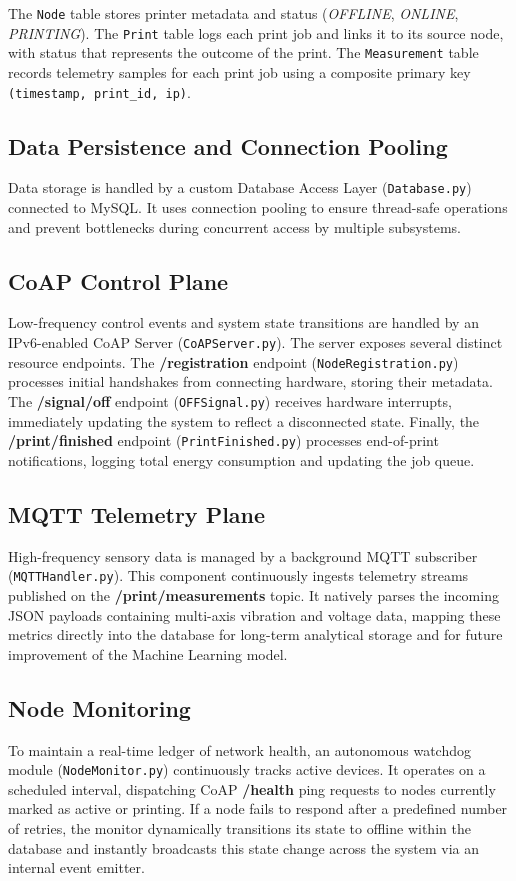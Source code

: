 \noindent

The \texttt{Node} table stores printer metadata and status (\textit{OFFLINE}, \textit{ONLINE}, \textit{PRINTING}). The \texttt{Print} table logs each print job and links it to its source node, with status that represents the outcome of the print. The \texttt{Measurement} table records telemetry samples for each print job using a composite primary key \texttt{(timestamp, print\_id, ip)}. 

\subsection{Data Persistence and Connection Pooling}
Data storage is handled by a custom Database Access Layer (\texttt{Database.py}) connected to MySQL. It uses connection pooling to ensure thread-safe operations and prevent bottlenecks during concurrent access by multiple subsystems.

\subsection{CoAP Control Plane}
Low-frequency control events and system state transitions are handled by an IPv6-enabled CoAP Server (\texttt{CoAPServer.py}). The server exposes several distinct resource endpoints. The \textbf{/registration} endpoint (\texttt{NodeRegistration.py}) processes initial handshakes from connecting hardware, storing their metadata. The \textbf{/signal/off} endpoint (\texttt{OFFSignal.py}) receives hardware interrupts, immediately updating the system to reflect a disconnected state. Finally, the \textbf{/print/finished} endpoint (\texttt{PrintFinished.py}) processes end-of-print notifications, logging total energy consumption and updating the job queue. 

\subsection{MQTT Telemetry Plane}
High-frequency sensory data is managed by a background MQTT subscriber (\texttt{MQTTHandler.py}). This component continuously ingests telemetry streams published on the \textbf{/print/measurements} topic. It natively parses the incoming JSON payloads containing multi-axis vibration and voltage data, mapping these metrics directly into the database for long-term analytical storage and for future improvement of the Machine Learning model. 

\subsection{Node Monitoring}
To maintain a real-time ledger of network health, an autonomous watchdog module (\texttt{NodeMonitor.py}) continuously tracks active devices. It operates on a scheduled interval, dispatching CoAP \textbf{/health} ping requests to nodes currently marked as active or printing. If a node fails to respond after a predefined number of retries, the monitor dynamically transitions its state to offline within the database and instantly broadcasts this state change across the system via an internal event emitter. 

